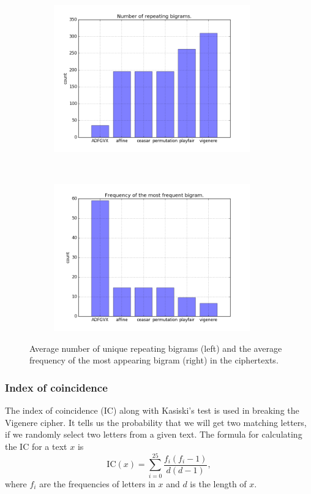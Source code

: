\documentclass[a4paper]{article}
\begin{document}
\begin{figure}[H]
    \centering
    \begin{subfigure}[h]{0.5\textwidth}
    		\centering
        \includegraphics[height=2.5in]{img/bigrams_1.png}
    \end{subfigure}%
    ~
    \begin{subfigure}[h]{0.5\textwidth}
	    \centering
        \includegraphics[height=2.5in]{img/bigrams_2.png}
    \end{subfigure}
    \caption{Average number of unique repeating bigrams (left) and the average frequency of the most appearing bigram (right) in the ciphertexts.}
    \label{fig:bigrams}
\end{figure}

\subsubsection{Index of coincidence}
The index of coincidence (IC) along with Kasiski's test is used in breaking the Vigenere cipher. It tells us the probability that we will get two matching letters, if we randomly select two letters from a given text. The formula for calculating the IC for a text $x$ is
$$\mbox{IC}(x) = \sum_{i=0}^{25} \frac{f_{i}(f_{i}-1)}{d(d-1)}, $$
where $f_{i}$ are the frequencies of letters in $x$ and $d$ is the length of $x$.
\end{document}
